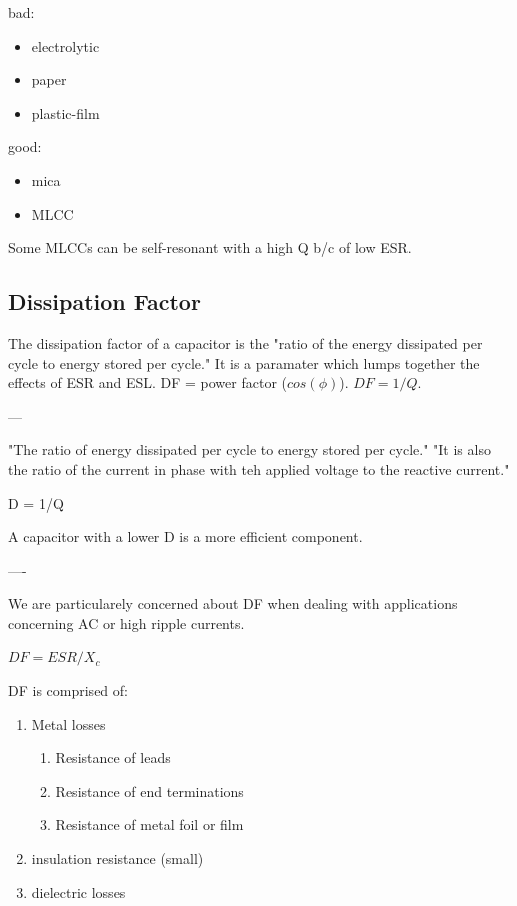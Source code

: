 bad:
\begin{itemize}
    \item electrolytic
    \item paper
    \item plastic-film
\end{itemize}

good:
\begin{itemize}
    \item mica
    \item MLCC
\end{itemize}

Some MLCCs can be self-resonant with a high Q b/c of low ESR.
\cite[Sect.~3.6.7]{elec_inv}

\subsection{Dissipation Factor}

The dissipation factor of a capacitor is the "ratio of the energy dissipated per cycle to energy stored per cycle." It is a paramater which lumps together the effects of ESR and ESL. DF = power factor ($cos(\phi)$). $DF = 1 / Q.$
\cite{anal_capProps}

---

"The ratio of energy dissipated per cycle to energy stored per cycle." "It is also the ratio of the current in phase with teh applied voltage to the reactive current."

D = 1/Q

A capacitor with a lower D is a more efficient component.
\cite[Sect.~3.6.7]{elec_inv}

----

We are particularely concerned about DF when dealing with applications concerning AC or high ripple currents.

$DF = ESR / X_c$

DF is comprised of:
\begin{enumerate}
    \item Metal losses
    \begin{enumerate}
        \item Resistance of leads
        \item Resistance of end terminations
        \item Resistance of metal foil or film
    \end{enumerate}
    \item insulation resistance (small)
    \item dielectric losses
\end{enumerate}
\cite{capSite_intro}

